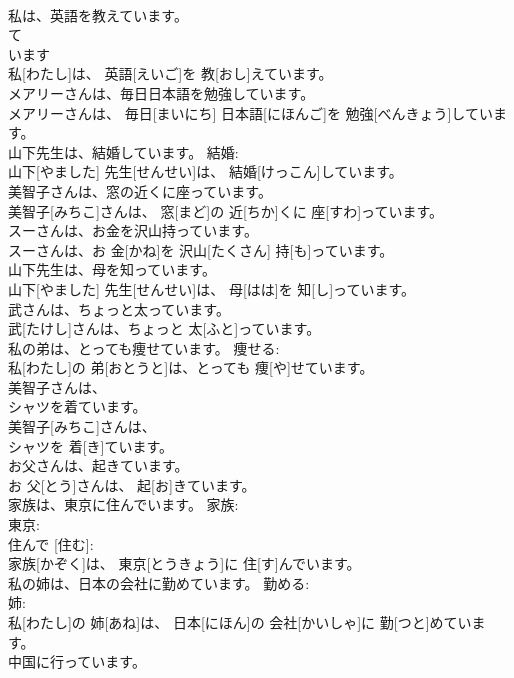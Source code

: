 \documentclass[8pt]{extreport}
\begin{document}
\begin{CJK}{UTF8}{min}
\\	私は、英語を教えています。	
\\	て 
\\	います 
\\	私[わたし]は、 英語[えいご]を 教[おし]えています。		
\\	メアリーさんは、毎日日本語を勉強しています。	
\\	メアリーさんは、 毎日[まいにち] 日本語[にほんご]を 勉強[べんきょう]しています。	
\\	山下先生は、結婚しています。	結婚: 
\\	山下[やました] 先生[せんせい]は、 結婚[けっこん]しています。	
\\	美智子さんは、窓の近くに座っています。	
\\	美智子[みちこ]さんは、 窓[まど]の 近[ちか]くに 座[すわ]っています。	
\\	スーさんは、お金を沢山持っています。	
\\	スーさんは、お 金[かね]を 沢山[たくさん] 持[も]っています。	
\\	山下先生は、母を知っています。	
\\	山下[やました] 先生[せんせい]は、 母[はは]を 知[し]っています。	
\\	武さんは、ちょっと太っています。	
\\	武[たけし]さんは、ちょっと 太[ふと]っています。	
\\	私の弟は、とっても痩せています。	痩せる: 
\\	私[わたし]の 弟[おとうと]は、とっても 痩[や]せています。	
\\	美智子さんは、
\\	シャツを着ています。	
\\	美智子[みちこ]さんは、 
\\	シャツを 着[き]ています。	
\\	お父さんは、起きています。	
\\	お 父[とう]さんは、 起[お]きています。	
\\	家族は、東京に住んでいます。	家族: 
\\	東京: 
\\	住んで [住む]: 
\\	家族[かぞく]は、 東京[とうきょう]に 住[す]んでいます。	
\\	私の姉は、日本の会社に勤めています。	勤める: 
\\	姉: 
\\	私[わたし]の 姉[あね]は、 日本[にほん]の 会社[かいしゃ]に 勤[つと]めています。	
\\	中国に行っています。	

\end{CJK}
\end{document}
